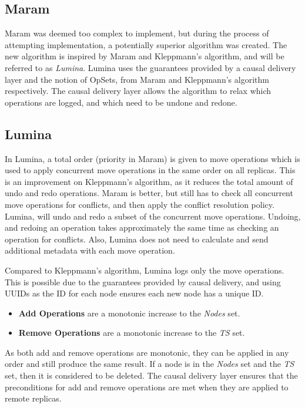 \documentclass[12pt]{report}
\begin{document}
\subsection{Maram}

Maram \cite{https://doi.org/10.48550/arxiv.2103.04828} was deemed too complex to implement, but during the process of attempting implementation, a potentially superior algorithm was created. The new algorithm is inspired by Maram and Kleppmann's algorithm, and will be referred to as \textit{Lumina}. Lumina uses the guarantees provided by a causal delivery layer and the notion of OpSets, from Maram and Kleppmann's algorithm respectively. The causal delivery layer allows the algorithm to relax which operations are logged, and which need to be undone and redone. \par 

\subsection{Lumina}
In Lumina, a total order (priority in Maram) is given to move operations which is used to apply concurrent move operations in the same order on all replicas. This is an improvement on Kleppmann's algorithm, as it reduces the total amount of undo and redo operations. Maram is better, but still has to check all concurrent move operations for conflicts, and then apply the conflict resolution policy. Lumina, will undo and redo a subset of the concurrent move operations. Undoing, and redoing an operation takes approximately the same time as checking an operation for conflicts. Also, Lumina does not need to calculate and send additional metadata with each move operation. \par 

Compared to Kleppmann's algorithm, Lumina logs only the move operations. This is possible due to the guarantees provided by causal delivery, and using UUIDs as the ID for each node ensures each new node has a unique ID.
\begin{itemize}
    \item \textbf{Add Operations} are a monotonic increase to the \textit{Nodes} set.
    \item \textbf{Remove Operations} are a monotonic increase to the \textit{TS} set.
\end{itemize}
As both add and remove operations are monotonic, they can be applied in any order and still produce the same result. If a node is in the \textit{Nodes} set and the \textit{TS} set, then it is considered to be deleted. The causal delivery layer ensures that the preconditions for add and remove operations are met when they are applied to remote replicas. \par
\end{document}
